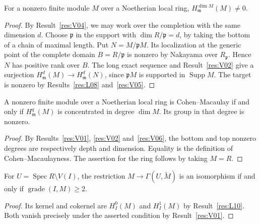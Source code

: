 \begin{theorem}\label{res:V06}
For a nonzero finite module \(M\) over a Noetherian local ring,
\(H_{\mathfrak m}^{\dim M}(M)\ne0\).
\end{theorem}
\begin{proof}
By Result~\ref{res:V04}, we may work over the completion with the
same dimension \(d\). Choose \(\mathfrak p\) in the support with
\(\dim R/\mathfrak p=d\), by taking the bottom of a chain of maximal
length. Put \(N=M/\mathfrak pM\). Its localization at the generic
point of the complete domain \(B=R/\mathfrak p\) is nonzero by
Nakayama over \(R_{\mathfrak p}\). Hence \(N\) has positive rank over
\(B\). The long exact sequence and Result~\ref{res:V02} give a
surjection \(H_{\mathfrak m}^d(M)\to H_{\mathfrak m}^d(N)\), since
\(\mathfrak p M\) is supported in \(\operatorname{Supp}M\).
The target is nonzero by Results~\ref{res:L08} and~\ref{res:V05}.
\end{proof}

\begin{corollary}\label{res:V07}
A nonzero finite module over a Noetherian local ring is
Cohen--Macaulay if and only if \(H^q_{\mathfrak m}(M)\) is
concentrated in degree \(\dim M\). Its group in that degree is nonzero.
\end{corollary}
\begin{proof}
By Results~\ref{res:V01}, \ref{res:V02} and~\ref{res:V06},
the bottom and top nonzero degrees are respectively depth and
dimension. Equality is the definition of Cohen--Macaulayness.
The assertion for the ring follows by taking \(M=R\).
\end{proof}

\begin{corollary}\label{res:V08}
For \(U=\operatorname{Spec}R\setminus V(I)\), the restriction
\(M\to\Gamma(U,\widetilde M)\) is an isomorphism if and only if
\(\operatorname{grade}(I,M)\geq2\).
\end{corollary}
\begin{proof}
Its kernel and cokernel are \(H_I^0(M)\) and \(H_I^1(M)\) by
Result~\ref{res:L10}. Both vanish precisely under the asserted
condition by Result~\ref{res:V01}.
\end{proof}
